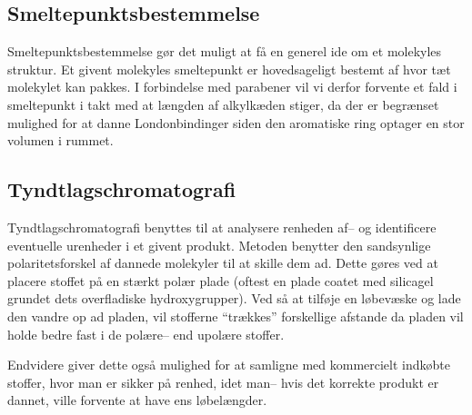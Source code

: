     \subsection{Smeltepunktsbestemmelse}
    Smeltepunktsbestemmelse gør det muligt at få en generel ide om et molekyles struktur. Et givent molekyles smeltepunkt er hovedsageligt bestemt af hvor tæt molekylet kan pakkes. I forbindelse med parabener vil vi derfor forvente et fald i smeltepunkt i takt med at længden af alkylkæden stiger, da der er begrænset mulighed for at danne Londonbindinger siden den aromatiske ring optager en stor volumen i rummet.

    \subsection{Tyndtlagschromatografi}
    Tyndtlagschromatografi benyttes til at analysere renheden af-- og identificere eventuelle urenheder i et givent produkt. Metoden benytter den sandsynlige polaritetsforskel af dannede molekyler til at skille dem ad. Dette gøres ved at placere stoffet på en stærkt polær plade (oftest en plade coatet med silicagel grundet dets overfladiske hydroxygrupper). Ved så at tilføje en løbevæske og lade den vandre op ad pladen, vil stofferne ``trækkes'' forskellige afstande da pladen vil holde bedre fast i de polære-- end upolære stoffer.

    Endvidere giver dette også mulighed for at samligne med kommercielt indkøbte stoffer, hvor man er sikker på renhed, idet man-- hvis det korrekte produkt er dannet, ville forvente at have ens løbelængder.
    


